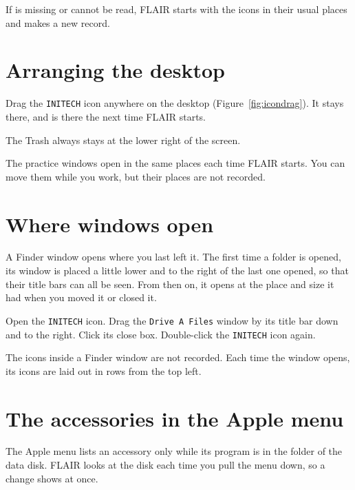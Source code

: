 If  is missing or cannot be read, FLAIR starts with the
icons in their usual places and makes a new record.

\section{Arranging the desktop}
Drag the \texttt{INITECH} icon anywhere on the
desktop (Figure~\ref{fig:icondrag}).  It stays there, and is there the next
time FLAIR starts.

The Trash always stays at the lower right of the
screen.

The practice windows open in the same places each
time FLAIR starts.  You can move them while you work, but their places are
not recorded.

\section{Where windows open}
A Finder window opens where you last left it.  The first time a folder is
opened, its window is placed a little lower and to the right of the last
one opened, so that their title bars can all be seen.  From then on, it
opens at the place and size it had when you moved it or closed it.
\begin{TaskSteps}
\Step Open the \texttt{INITECH} icon.
\Step Drag the \texttt{Drive A Files} window by its title bar down and to
the right.
\Step Click its close box.
\Step Double-click the \texttt{INITECH} icon again.
\end{TaskSteps}


The icons inside a Finder window are not recorded.  Each time the window
opens, its icons are laid out in rows from the top left.

\section{The accessories in the Apple menu}
The Apple menu lists an accessory only while its program is in the
 folder of the data disk.  FLAIR looks at the disk each time you
pull the menu down, so a change shows at once.

